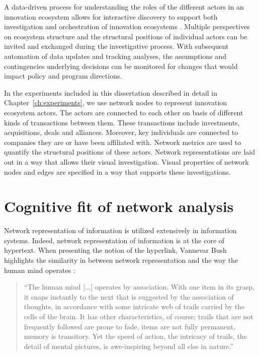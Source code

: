 A data-driven process for understanding the roles of the different actors in an innovation ecosystem allows for interactive discovery to support both investigation and orchestration of innovation ecosystems \citep{Russell2015RelationalEcosystems}. Multiple perspectives on ecosystem structure and the structural positions of individual actors can be invited and exchanged during the investigative process. With subsequent automation of data updates and tracking analyses, the assumptions and contingencies underlying decisions can be monitored for changes that would impact policy and program directions.

In the experiments included in this dissertation described in detail in Chapter~\ref{ch:experiments}, we use network nodes to represent innovation ecosystem actors. The actors are connected to each other on basis of different kinds of transactions between them. These transactions include investments, acquisitions, deals and alliances. Moreover, key individuals are connected to companies they are or have been affiliated with. Network metrics are used to quantify the structural positions of these actors. Network representations are laid out in a way that allows their visual investigation. Visual properties of network nodes and edges are specified in a way that supports these investigations.


\section{Cognitive fit of network analysis}

Network representation of information is utilized extensively in information systems. Indeed, network representation of information is at the core of hypertext. When presenting the notion of the hyperlink, Vannevar Bush highlights the similarity in between network representation and the way the human mind operates \citep{Bush1945AsThink}: 

\begin{quote}
``The human mind [...] operates by association. With one item in its grasp, it snaps instantly to the next that is suggested by the association of thoughts, in accordance with some intricate web of trails carried by the cells of the brain. It has other characteristics, of course; trails that are not frequently followed are prone to fade, items are not fully permanent, memory is transitory. Yet the speed of action, the intricacy of trails, the detail of mental pictures, is awe-inspiring beyond all else in nature.''
\end{quote}

